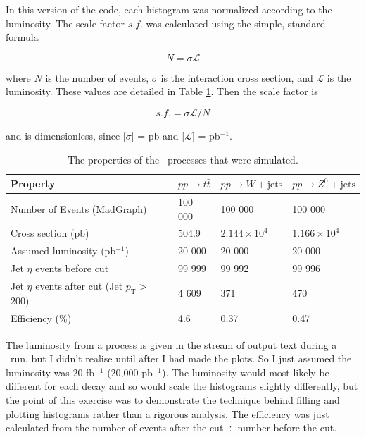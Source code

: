In this version of the code, each histogram was normalized according to the luminosity. The scale factor $s.f.$ was calculated using the simple, standard formula

\begin{equation}
\label{eq:lumiexpev}
N = \sigma \mathcal{L}
\end{equation}

where $N$ is the number of events, $\sigma$ is the interaction cross section, and $\mathcal{L}$ is the luminosity. These values are detailed in Table \ref{tab:comparison}. Then the scale factor is

\begin{equation}
s.f. = \sigma \mathcal{L} / N
\end{equation}

and is dimensionless, since [$\sigma$] = pb and [$\mathcal{L}$] = pb$^{-1}$.

\begin{table}[H]
\centering
    \begin{tabular}{|l|l|l|l|}
    \hline
    Property                                & $pp \rightarrow t\bar{t}$ & $pp \rightarrow W + \mathrm{jets}$ & $pp \rightarrow Z^0 + \mathrm{jets}$ \\ \hline
    Number of Events (MadGraph)             & 100 000 & 100 000 & 100 000 \\
    Cross section (pb)                      & 504.9   & $2.144\times10^4$ & $1.166\times10^4$ \\
    Assumed luminosity (pb$^{-1}$)		& 20 000	& 20 000 & 20 000 \\
    Jet $\eta$ events before cut               & 99 999  & 99 992  & 99 996  \\
    Jet $\eta$  events after cut (Jet $p_{\mathrm{T}} >$ 200) & 4 609    & 371     & 470     \\
    Efficiency (\%)                         & 4.6     & 0.37    & 0.47    \\ \hline
    \end{tabular}
\caption{The properties of the \madgraph\ processes that were simulated.}
\label{tab:comparison}
\end{table}

The luminosity from a process is given in the stream of output text during a \madgraph\ run, but I didn't realise until after I had made the plots. So I just assumed the luminosity was 20 fb$^{-1}$ (20,000 pb$^{-1}$). The luminosity would most likely be different for each decay and so would scale the histograms slightly differently, but the point of this exercise was to demonstrate the technique behind filling and plotting histograms rather than a rigorous analysis. The efficiency was just calculated from the number of events after the cut $\div$ number before the cut.

